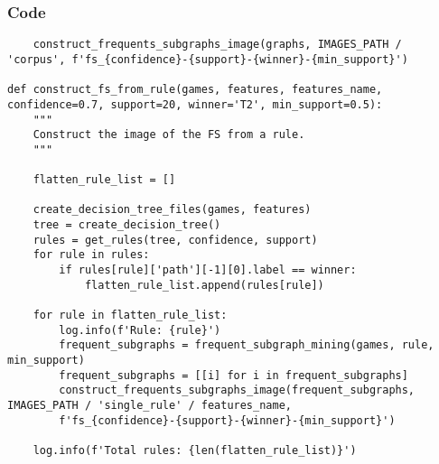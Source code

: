 \documentclass{beamer}
\begin{document}
\begin{frame}[t, fragile]
    \frametitle{Code}
    \fontsize{3pt}{5pt}\selectfont
    \begin{verbatim}
    construct_frequents_subgraphs_image(graphs, IMAGES_PATH / 'corpus', f'fs_{confidence}-{support}-{winner}-{min_support}')

def construct_fs_from_rule(games, features, features_name, confidence=0.7, support=20, winner='T2', min_support=0.5):
    """
    Construct the image of the FS from a rule.
    """

    flatten_rule_list = []

    create_decision_tree_files(games, features)
    tree = create_decision_tree()
    rules = get_rules(tree, confidence, support)
    for rule in rules:
        if rules[rule]['path'][-1][0].label == winner:
            flatten_rule_list.append(rules[rule])

    for rule in flatten_rule_list:
        log.info(f'Rule: {rule}')
        frequent_subgraphs = frequent_subgraph_mining(games, rule, min_support)
        frequent_subgraphs = [[i] for i in frequent_subgraphs]
        construct_frequents_subgraphs_image(frequent_subgraphs, IMAGES_PATH / 'single_rule' / features_name,
        f'fs_{confidence}-{support}-{winner}-{min_support}')
    
    log.info(f'Total rules: {len(flatten_rule_list)}')
    \end{verbatim}
\end{frame}

\end{document}
